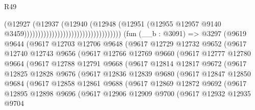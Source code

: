 \begin{lexlean}{R49}
\begin{coremodule}
                                                              (@12927
                                                                (@12937
                                                                  (@12940
                                                                    (@12948
                                                                      (@12951
                                                                        (@12955
                                                                          @12957
                                                                          @9140
                                                                          @3459)))))))))))))))))))))))))))))))))))
    (fun (__b : @3091) =>
    @3297
      (@9619
        @9644
        (@9617
          @12703
          @12706
          @9648
          (@9617
            @12729
            @12732
            @9652
            (@9617
              @12740
              @12743
              @9656
              (@9617
                @12766
                @12769
                @9660
                (@9617
                  @12777
                  @12780
                  @9664
                  (@9617
                    @12788
                    @12791
                    @9668
                    (@9617
                      @12814
                      @12817
                      @9672
                      (@9617
                        @12825
                        @12828
                        @9676
                        (@9617
                          @12836
                          @12839
                          @9680
                          (@9617
                            @12847
                            @12850
                            @9684
                            (@9617
                              @12858
                              @12861
                              @9688
                              (@9617
                                @12869
                                @12872
                                @9692
                                (@9617
                                  @12895
                                  @12898
                                  @9696
                                  (@9617
                                    @12906
                                    @12909
                                    @9700
                                    (@9617
                                      @12932
                                      @12935
                                      @9704

\end{coremodule}
\end{lexlean}
